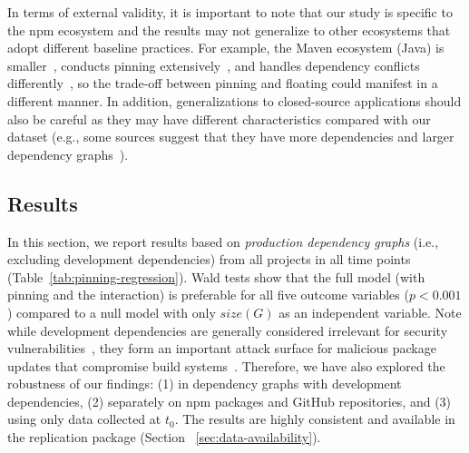 In terms of external validity, it is important to note that our study is specific to the npm ecosystem and the results may not generalize to other ecosystems that adopt different baseline practices.
For example, the Maven ecosystem (Java) is smaller~\cite{module-counts}, conducts pinning extensively~\cite{DBLP:conf/msr/0001PSTB19}, and handles dependency conflicts differently~\cite{DBLP:conf/sigsoft/WangWLWWYYZC18}, so the trade-off between pinning and floating could manifest in a different manner.
In addition, generalizations to closed-source applications should also be careful as they may have different characteristics compared with our dataset (e.g., some sources suggest that they have more dependencies and larger dependency graphs~\cite{sonatype-report}).

\subsection{Results}
\label{sec:results-rq2}

In this section, we report results based on \emph{production dependency graphs} (i.e., excluding development dependencies) from all projects in all time points (Table~\ref{tab:pinning-regression}).
Wald tests show that the full model (with pinning and the interaction) is preferable for all five outcome variables ($p<0.001$) compared to a null model with only $size(G)$ as an independent variable.
Note while development dependencies are generally considered irrelevant for security vulnerabilities~\cite{DBLP:conf/kbse/LatendresseMCS22, DBLP:conf/esem/PashchenkoPPSM18}, they form an important attack surface for malicious package updates that compromise build systems~\cite{DBLP:conf/sp/LadisaPMB23, DBLP:conf/dimva/OhmPS020}.
Therefore, we have also explored the robustness of our findings: (1) in dependency graphs with development dependencies, (2) separately on npm packages and GitHub repositories, and (3) using only data collected at $t_0$. 
The results are highly consistent and available in the replication package (Section~
\ref{sec:data-availability}).

